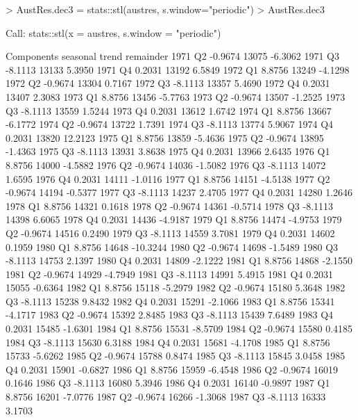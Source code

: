 \begin{Schunk}
\begin{Sinput}
> AustRes.dec3 = stats::stl(austres, s.window="periodic") 
> AustRes.dec3 
\end{Sinput}
\begin{Soutput}
 Call:
 stats::stl(x = austres, s.window = "periodic")

Components
        seasonal trend remainder
1971 Q2  -0.9674 13075   -6.3062
1971 Q3  -8.1113 13133    5.3950
1971 Q4   0.2031 13192    6.5849
1972 Q1   8.8756 13249   -4.1298
1972 Q2  -0.9674 13304    0.7167
1972 Q3  -8.1113 13357    5.4690
1972 Q4   0.2031 13407    2.3083
1973 Q1   8.8756 13456   -5.7763
1973 Q2  -0.9674 13507   -1.2525
1973 Q3  -8.1113 13559    1.5244
1973 Q4   0.2031 13612    1.6742
1974 Q1   8.8756 13667   -6.1772
1974 Q2  -0.9674 13722    1.7391
1974 Q3  -8.1113 13774    5.9067
1974 Q4   0.2031 13820   12.2123
1975 Q1   8.8756 13859   -5.4636
1975 Q2  -0.9674 13895   -1.4363
1975 Q3  -8.1113 13931    3.8638
1975 Q4   0.2031 13966    2.6435
1976 Q1   8.8756 14000   -4.5882
1976 Q2  -0.9674 14036   -1.5082
1976 Q3  -8.1113 14072    1.6595
1976 Q4   0.2031 14111   -1.0116
1977 Q1   8.8756 14151   -4.5138
1977 Q2  -0.9674 14194   -0.5377
1977 Q3  -8.1113 14237    2.4705
1977 Q4   0.2031 14280    1.2646
1978 Q1   8.8756 14321    0.1618
1978 Q2  -0.9674 14361   -0.5714
1978 Q3  -8.1113 14398    6.6065
1978 Q4   0.2031 14436   -4.9187
1979 Q1   8.8756 14474   -4.9753
1979 Q2  -0.9674 14516    0.2490
1979 Q3  -8.1113 14559    3.7081
1979 Q4   0.2031 14602    0.1959
1980 Q1   8.8756 14648  -10.3244
1980 Q2  -0.9674 14698   -1.5489
1980 Q3  -8.1113 14753    2.1397
1980 Q4   0.2031 14809   -2.1222
1981 Q1   8.8756 14868   -2.1550
1981 Q2  -0.9674 14929   -4.7949
1981 Q3  -8.1113 14991    5.4915
1981 Q4   0.2031 15055   -0.6364
1982 Q1   8.8756 15118   -5.2979
1982 Q2  -0.9674 15180    5.3648
1982 Q3  -8.1113 15238    9.8432
1982 Q4   0.2031 15291   -2.1066
1983 Q1   8.8756 15341   -4.1717
1983 Q2  -0.9674 15392    2.8485
1983 Q3  -8.1113 15439    7.6489
1983 Q4   0.2031 15485   -1.6301
1984 Q1   8.8756 15531   -8.5709
1984 Q2  -0.9674 15580    0.4185
1984 Q3  -8.1113 15630    6.3188
1984 Q4   0.2031 15681   -4.1708
1985 Q1   8.8756 15733   -5.6262
1985 Q2  -0.9674 15788    0.8474
1985 Q3  -8.1113 15845    3.0458
1985 Q4   0.2031 15901   -0.6827
1986 Q1   8.8756 15959   -6.4548
1986 Q2  -0.9674 16019    0.1646
1986 Q3  -8.1113 16080    5.3946
1986 Q4   0.2031 16140   -0.9897
1987 Q1   8.8756 16201   -7.0776
1987 Q2  -0.9674 16266   -1.3068
1987 Q3  -8.1113 16333    3.1703

\end{Soutput}
\end{Schunk}
